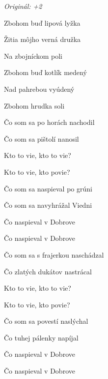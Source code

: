 \begin{song}


\begin{headerbox}
\textit{Originál: +2} \quad
\end{headerbox}

\begin{hchordbox}
\end{hchordbox}

\Large

\bigskip

Zbohom buď lipová lyžka \par
{}Žitia môjho verná družka \par
{}Na zbojníckom poli \par

\bigskip

Zbohom buď kotlík medený \par
{}Nad pahrebou vyúdený \par
{}Zbohom hrudka soli \par

\bigskip

Čo som sa po horách nachodil \par
{}Čo som sa pištolí nanosil \par
{}Kto to vie, kto to vie? \par
{}Kto to vie, kto povie? \par

\bigskip

Čo som sa naspieval po grúni \par
{}Čo som sa navyhrážal Viedni \par
{}Čo naspieval v Dobrove \par
{}Čo naspieval v Dobrove \par

\bigskip

Čo som sa s frajerkou naschádzal \par
{}Čo zlatých dukátov nastrácal \par
{}Kto to vie, kto to vie? \par
{}Kto to vie, kto povie? \par

\bigskip

Čo som sa povestí naslýchal \par
{}Čo tuhej pálenky napíjal \par
{}Čo naspieval v Dobrove \par
{}Čo naspieval v Dobrove \par

\bigskip


\end{song}
